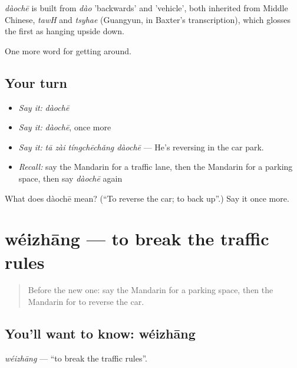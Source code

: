 \begin{cousinweb}
\emph{dàochē} is built from \emph{dào} 'backwards' and  'vehicle', both inherited from Middle Chinese, \emph{tawH} and \emph{tsyhae} (Guangyun, in Baxter's transcription), which glosses the first as hanging upside down.
\end{cousinweb}

\begin{grammarlens}[title={What you've built}]
One more word for getting around.
\end{grammarlens}

\subsection*{Your turn}
\begin{itemize}
\raggedright
  \item \emph{Say it:} \emph{dàochē}
  \item \emph{Say it:} \emph{dàochē}, once more
  \item \emph{Say it:} \emph{tā zài tíngchēchǎng dàochē} — He's reversing in the car park.
  \item \emph{Recall:} say the Mandarin for a traffic lane, then the Mandarin for a parking space, then say \emph{dàochē} again
\end{itemize}

\begin{tcolorbox}[breakable,colback=teal!4,colframe=teal!35!black,title={Before you move on}]
What does dàochē mean? (\textquotedblleft{}To reverse the car; to back up\textquotedblright{}.) Say it once more.
\end{tcolorbox}
\section[wéizhāng]{wéizhāng — to break the traffic rules}

\label{lesson:ZH-C420-weizhang}



\begin{quote}
Before the new one: say the Mandarin for a parking space, then the Mandarin for to reverse the car.
\end{quote}

\subsection*{You'll want to know: wéizhāng}
\emph{wéizhāng} — \textquotedblleft{}to break the traffic rules\textquotedblright{}.

